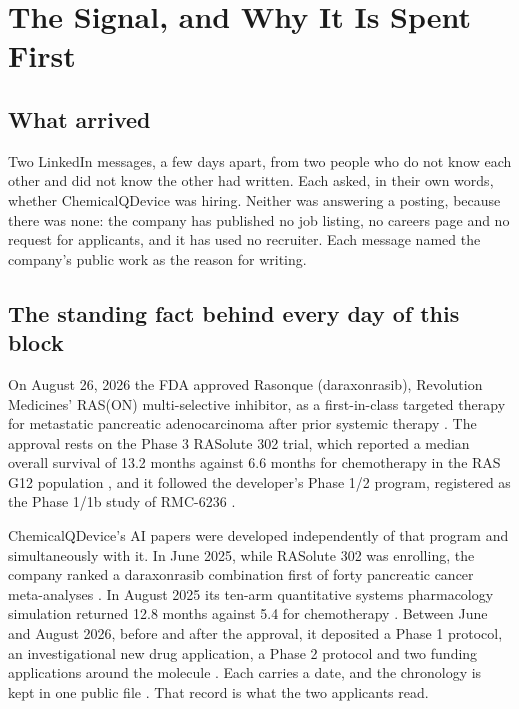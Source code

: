 \section{The Signal, and Why It Is Spent First}

\subsection{What arrived}

Two LinkedIn messages, a few days apart, from two people who do not know each
other and did not know the other had written. Each asked, in their own words,
whether ChemicalQDevice was hiring. Neither was answering a posting, because
there was none: the company has published no job listing, no careers page and
no request for applicants, and it has used no recruiter. Each message named the
company's public work as the reason for writing.

\subsection{The standing fact behind every day of this block}

On August 26, 2026 the FDA approved Rasonque (daraxonrasib), Revolution
Medicines' RAS(ON) multi-selective inhibitor, as a first-in-class targeted
therapy for metastatic pancreatic adenocarcinoma after prior systemic therapy
\cite{fdarasonque2026,fdadisco2026,revmedapproval2026}. The approval rests on the
Phase 3 RASolute 302 trial, which reported a median overall survival of 13.2
months against 6.6 months for chemotherapy in the RAS G12 population
\cite{rasolute302,ctgov302}, and it followed the developer's Phase 1/2 program,
registered as the Phase 1/1b study of RMC-6236 \cite{ctgov001}.

ChemicalQDevice's AI papers were developed independently of that program and
simultaneously with it. In June 2025, while RASolute 302 was enrolling, the
company ranked a daraxonrasib combination first of forty pancreatic cancer
meta-analyses \cite{daraxident}. In August 2025 its ten-arm quantitative systems
pharmacology simulation returned 12.8 months against 5.4 for chemotherapy
\cite{qspmetpancre}. Between June and August 2026, before and after the approval,
it deposited a Phase 1 protocol, an investigational new drug application, a
Phase 2 protocol and two funding applications around the molecule
\cite{onpremwhippl,phase1ind,phase2proto,fundapp1,fundapp2}. Each carries a date,
and the chronology is kept in one public file \cite{daraxstory2026}. That record
is what the two applicants read.


